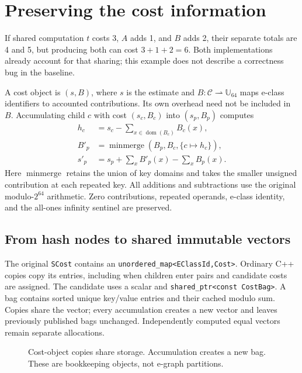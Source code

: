 \documentclass[10pt,a4paper]{article}
\newcommand{\tool}[1]{\texttt{#1}}
\newcommand{\mm}{\operatorname{minmerge}}
\begin{document}
\section{Preserving the cost information}
If shared computation $t$ costs 3, $A$ adds 1, and $B$ adds 2, their separate
totals are 4 and 5, but producing both can cost $3+1+2=6$. Both implementations
already account for that sharing; this example does not describe a correctness
bug in the baseline.

A cost object is $(s,B)$, where $s$ is the estimate and
$B:\mathcal C\rightharpoonup\mathbb U_{64}$ maps e-class identifiers to
accounted contributions. Its own overhead need not be included in $B$.
Accumulating child $c$ with cost $(s_c,B_c)$ into $(s_p,B_p)$ computes
\begin{align}
 h_c &= s_c-\sum_{x\in\operatorname{dom}(B_c)}B_c(x),\\
 B'_p &= \mm(B_p,B_c,\{c\mapsto h_c\}),\\
 s'_p &= s_p+\sum_x B'_p(x)-\sum_x B_p(x).
 \label{eq:update}
\end{align}
Here $\mm$ retains the union of key domains and takes the smaller unsigned
contribution at each repeated key. All additions and subtractions use the
original modulo-$2^{64}$ arithmetic. Zero contributions, repeated operands,
e-class identity, and the all-ones infinity sentinel are preserved.

\subsection{From hash nodes to shared immutable vectors}
The original \tool{SCost} contains an \tool{unordered\_map<EClassId,Cost>}.
Ordinary C++ copies copy its entries, including when children enter pairs and
candidate costs are assigned. The candidate uses a scalar and
\tool{shared\_ptr<const CostBag>}. A bag contains sorted unique key/value entries
and their cached modulo sum. Copies share the vector; every accumulation
creates a new vector and leaves previously published bags unchanged.
Independently computed equal vectors remain separate allocations.

\begin{figure}[ht]
\centering
{}
\caption{Cost-object copies share storage. Accumulation creates a new bag.
These are bookkeeping objects, not e-graph partitions.}
\end{figure}
\end{document}

